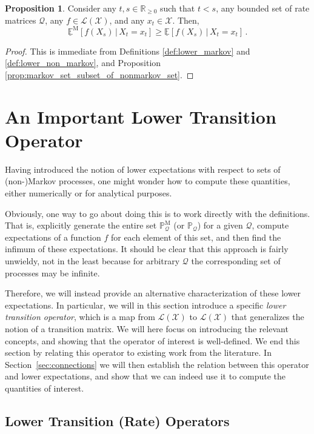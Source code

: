 \documentclass[10pt]{paper}
\theoremstyle{definition}
\newtheorem{proposition}[theorem]{Proposition}
\newcommand{\reals}{\mathbb{R}}
\newcommand{\realsnonneg}{\reals_{\geq 0}}
\newcommand{\states}{\mathcal{X}}
\newcommand{\processes}{\mathbb{P}}
\newcommand{\mprocesses}{\processes^{\mathrm{M}}}
\newcommand{\gambles}{\mathcal{L}}
\newcommand{\gamblesX}{\gambles(\states)}
\newcommand{\rateset}{\mathcal{Q}}
\begin{document}
\begin{proposition}\label{prop:lower_exp_markov_bounded_by_nonmarkov}
Consider any $t,s\in\realsnonneg$ such that $t<s$, any bounded set of rate matrices $\rateset$, any $f\in\gamblesX$, and any $x_t\in\states$. Then,
\begin{equation*}
\underline{\mathbb{E}}^\mathrm{M}[f(X_s)\,\vert\,X_t=x_t] \geq \underline{\mathbb{E}}[f(X_s)\,\vert\,X_t=x_t]\,.
\end{equation*}
\end{proposition}
\begin{proof}
This is immediate from Definitions \ref{def:lower_markov} and \ref{def:lower_non_markov}, and Proposition \ref{prop:markov_set_subset_of_nonmarkov_set}.
\end{proof}

\section{An Important Lower Transition Operator}
\label{sec:lowertrans}

Having introduced the notion of lower expectations with respect to sets of (non-)Markov processes, one might wonder how to compute these quantities, either numerically or for analytical purposes. 

Obviously, one way to go about doing this is to work directly with the definitions. That is, explicitly generate the entire set $\mprocesses_\rateset$ (or $\processes_\rateset$) for a given $\rateset$, compute expectations of a function $f$ for each element of this set, and then find the infimum of these expectations. It should be clear that this approach is fairly unwieldy, not in the least because for arbitrary $\rateset$ the corresponding set of processes may be infinite.

Therefore, we will instead provide an alternative characterization of these lower expectations. In particular, we will in this section introduce a specific \emph{lower transition operator}, which is a map from $\gamblesX$ to $\gamblesX$ that generalizes the notion of a transition matrix. We will here focus on introducing the relevant concepts, and showing that the operator of interest is well-defined. We end this section by relating this operator to existing work from the literature. In Section~\ref{sec:connections} we will then establish the relation between this operator and lower expectations, and show that we can indeed use it to compute the quantities of interest.

\subsection{Lower Transition (Rate) Operators}
\end{document}
